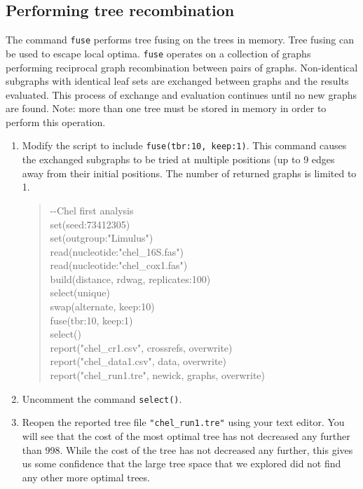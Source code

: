\documentclass[11pt]{article}
\begin{document}
\subsection{Performing tree recombination}
\label{subsec:Fusing}

The command \texttt{fuse} performs tree fusing on the trees in memory. Tree 
fusing can be used to escape local optima. \texttt{fuse} operates on a collection 
of graphs performing reciprocal graph recombination between pairs of graphs. 
Non-identical subgraphs with identical leaf sets are exchanged between graphs 
and the results evaluated. This process of exchange and evaluation continues 
until no new graphs are found. Note: more than one tree must be stored in 
memory in order to perform this operation.

\begin{enumerate}

\item Modify the script to include \texttt{fuse(tbr:10, keep:1)}. This command 
causes the exchanged subgraphs to be tried at multiple positions (up to 9 
edges away from their initial positions. The number of returned graphs is 
limited to 1.

	\begin{quote}
	-\/-Chel first analysis\\
	set(seed:73412305)\\
	set(outgroup:"Limulus")\\
	read(nucleotide:"chel\_16S.fas")\\
	read(nucleotide:"chel\_cox1.fas")\\
	build(distance, rdwag, replicates:100)\\
	select(unique)\\
	swap(alternate, keep:10)\\
	fuse(tbr:10, keep:1)\\
	select()\\
	report("chel\_cr1.csv", crossrefs, overwrite)\\
	report("chel\_data1.csv", data, overwrite)\\
	report("chel\_run1.tre", newick, graphs, overwrite)\\
	\end{quote}

\item Uncomment the command \texttt{select()}.

\item Reopen the reported tree file \texttt{"chel\_run1.tre"} using your text editor.
You will see that the cost of the most optimal tree has not decreased any further 
than 998. While the cost of the tree has not decreased any further, this gives us
some confidence that the large tree space that we explored did not find any
other more optimal trees.

\end{enumerate}
\end{document}
